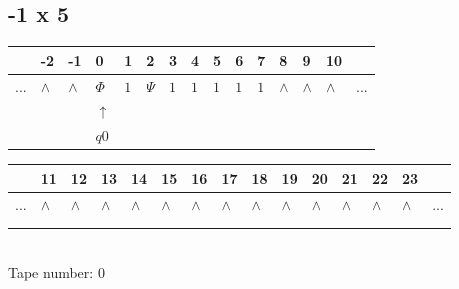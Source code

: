 \documentclass[11pt]{article}
\begin{document}
\subsection{-1 x 5}

\begin{table}[H]
\centering
\begin{tabular}{lllllllllllllll}
 & -2 & -1 & 0 & 1 & 2 & 3 & 4 & 5 & 6 & 7 & 8 & 9 & 10 & \\
\hline
$...$ & \multicolumn{1}{|l|}{$\wedge$} & \multicolumn{1}{|l|}{$\wedge$} & \multicolumn{1}{|l|}{$\Phi$} & \multicolumn{1}{|l|}{$1$} & \multicolumn{1}{|l|}{$\Psi$} & \multicolumn{1}{|l|}{$1$} & \multicolumn{1}{|l|}{$1$} & \multicolumn{1}{|l|}{$1$} & \multicolumn{1}{|l|}{$1$} & \multicolumn{1}{|l|}{$1$} & \multicolumn{1}{|l|}{$\wedge$} & \multicolumn{1}{|l|}{$\wedge$} & \multicolumn{1}{|l|}{$\wedge$} & $...$\\
\hline
&  &  & $\uparrow$ &  &  &  &  &  &  &  &  &  &  &  \\
&  &  & $ q0 $ &  &  &  &  &  &  &  &  &  &  &  \\
\end{tabular}
\begin{tabular}{lllllllllllllll}
 & 11 & 12 & 13 & 14 & 15 & 16 & 17 & 18 & 19 & 20 & 21 & 22 & 23 & \\
\hline
$...$ & \multicolumn{1}{|l|}{$\wedge$} & \multicolumn{1}{|l|}{$\wedge$} & \multicolumn{1}{|l|}{$\wedge$} & \multicolumn{1}{|l|}{$\wedge$} & \multicolumn{1}{|l|}{$\wedge$} & \multicolumn{1}{|l|}{$\wedge$} & \multicolumn{1}{|l|}{$\wedge$} & \multicolumn{1}{|l|}{$\wedge$} & \multicolumn{1}{|l|}{$\wedge$} & \multicolumn{1}{|l|}{$\wedge$} & \multicolumn{1}{|l|}{$\wedge$} & \multicolumn{1}{|l|}{$\wedge$} & \multicolumn{1}{|l|}{$\wedge$} & $...$\\
\hline
&  &  &  &  &  &  &  &  &  &  &  &  &  &  \\
&  &  &  &  &  &  &  &  &  &  &  &  &  &  \\
\end{tabular}
\\
Tape number: 0
\noindent\makebox[\linewidth]{\hdashrule{\textwidth}{1pt}{1pt}}\end{table}
\end{document}
